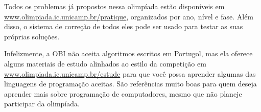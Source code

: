 Todos os problemas já propostos nessa olimpíada estão disponíveis em \url{www.olimpiada.ic.unicamp.br/pratique}, organizados por ano, nível e fase. Além disso, o sistema de correção de todos eles pode ser usado para testar as suas próprias soluções.

Infelizmente, a OBI não aceita algoritmos escritos em Portugol, mas ela oferece alguns materiais de estudo alinhados ao estilo da competição em \url{www.olimpiada.ic.unicamp.br/estude} para que você possa aprender algumas das linguagens de programação aceitas. São referências muito boas para quem deseja aprender mais sobre programação de computadores, mesmo que não planeje participar da olimpíada.

\ifnum{}
\clearpage
\else
\notasfinais
\fi




\nocite{*}
